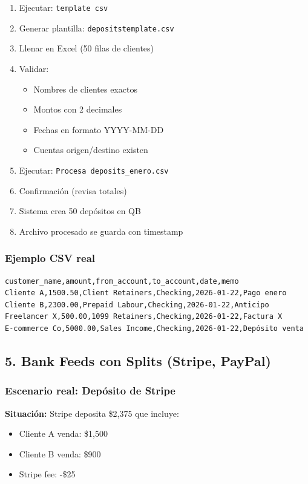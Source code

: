 \documentclass[12pt,oneside]{article}
\begin{document}
\begin{enumerate}
    \item Ejecutar: \texttt{template csv}
    \item Generar plantilla: \texttt{depositstemplate.csv}
    \item Llenar en Excel (50 filas de clientes)
    \item Validar:
    \begin{itemize}
        \item Nombres de clientes exactos
        \item Montos con 2 decimales
        \item Fechas en formato YYYY-MM-DD
        \item Cuentas origen/destino existen
    \end{itemize}
    \item Ejecutar: \texttt{Procesa deposits\_enero.csv}
    \item Confirmación (revisa totales)
    \item Sistema crea 50 depósitos en QB
    \item Archivo procesado se guarda con timestamp
\end{enumerate}

\subsubsection{Ejemplo CSV real}

\begin{verbatim}
customer_name,amount,from_account,to_account,date,memo
Cliente A,1500.50,Client Retainers,Checking,2026-01-22,Pago enero
Cliente B,2300.00,Prepaid Labour,Checking,2026-01-22,Anticipo
Freelancer X,500.00,1099 Retainers,Checking,2026-01-22,Factura X
E-commerce Co,5000.00,Sales Income,Checking,2026-01-22,Depósito venta
\end{verbatim}

\subsection{5. Bank Feeds con Splits (Stripe, PayPal)}

\subsubsection{Escenario real: Depósito de Stripe}

\textbf{Situación:} Stripe deposita \$2,375 que incluye:
\begin{itemize}
    \item Cliente A venda: \$1,500
    \item Cliente B venda: \$900
    \item Stripe fee: -\$25
\end{itemize}
\end{document}
